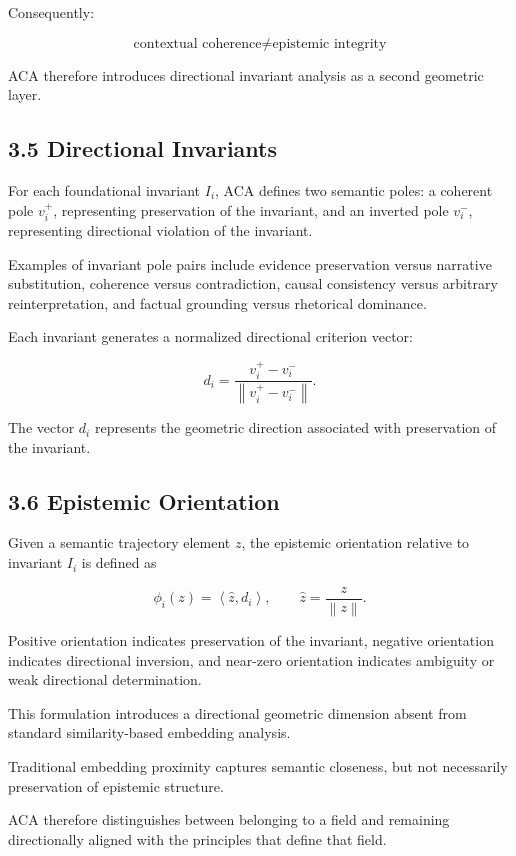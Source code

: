 \documentclass[11pt]{article}
\begin{document}
Consequently:

$$
\text{contextual coherence}
\neq
\text{epistemic integrity}
$$

ACA therefore introduces directional invariant analysis as a second geometric layer.

\subsection{3.5 Directional Invariants}

For each foundational invariant $I_i$, ACA defines two semantic poles: a coherent pole $v_i^{+}$, representing preservation of the invariant, and an inverted pole $v_i^{-}$, representing directional violation of the invariant.

Examples of invariant pole pairs include evidence preservation versus narrative substitution, coherence versus contradiction, causal consistency versus arbitrary reinterpretation, and factual grounding versus rhetorical dominance.

Each invariant generates a normalized directional criterion vector:

$$
d_i
=
\frac{
v_i^{+}-v_i^{-}
}{
\left\lVert v_i^{+}-v_i^{-}\right\rVert
}.
$$

The vector $d_i$ represents the geometric direction associated with preservation of the invariant.

\subsection{3.6 Epistemic Orientation}

Given a semantic trajectory element $z$, the epistemic orientation relative to invariant $I_i$ is defined as

$$
\phi_i(z)
=
\left\langle \hat{z},d_i\right\rangle,
\qquad
\hat{z}
=
\frac{z}{\left\lVert z\right\rVert}.
$$

Positive orientation indicates preservation of the invariant, negative orientation indicates directional inversion, and near-zero orientation indicates ambiguity or weak directional determination.

This formulation introduces a directional geometric dimension absent from standard similarity-based embedding analysis.

Traditional embedding proximity captures semantic closeness, but not necessarily preservation of epistemic structure.

ACA therefore distinguishes between belonging to a field and remaining directionally aligned with the principles that define that field.
\end{document}
